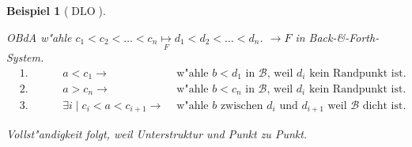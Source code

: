 \documentclass[a4paper,12pt,numbers=noenddot,parskip=full]{scrartcl}
\newcommand{\scrB}{\mathcal{B}}
\DeclareMathOperator{\dlo}{DLO}
\theoremstyle{dotless}
\newtheorem{example}[theorem]{Beispiel}
\begin{document}
\begin{example}[$\dlo$]
\begin{enumerate}
		OBdA w"ahle $c_1<c_2<\dots<c_n \underset{F}{\mapsto} d_1<d_2<\dots<d_n$. $\longrightarrow F$ in Back-\&-Forth-System.
		\begin{align*}
			&\text{1. Fall: } &a< c_1 \rightarrow &\text{ w"ahle } b<d_1 \text{ in } \scrB \text{, weil } d_i \text{ kein Randpunkt ist.}\\
			&\text{2. Fall: } &a>c_n \rightarrow &\text{ w"ahle } b<c_n \text{ in } \scrB \text{, weil } d_i \text{ kein Randpunkt ist.}\\
			&\text{3. Fall: } &\exists i \mid c_i<a<c_{i+1} \rightarrow &\text{ w"ahle } b \text{ zwischen } d_i \text{ und } d_{i+1} \text{ weil } \scrB \text{ dicht ist.}
		\end{align*}
		
		Vollst"andigkeit folgt, weil Unterstruktur und Punkt zu Punkt.
	\end{enumerate}
\end{example}
\end{document}

